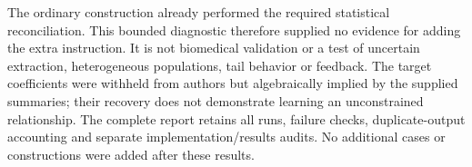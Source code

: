 \documentclass[11pt,letterpaper]{article}
\begin{document}
The ordinary construction already performed the required statistical reconciliation. This bounded diagnostic therefore supplied no evidence for adding the extra instruction. It is not biomedical validation or a test of uncertain extraction, heterogeneous populations, tail behavior or feedback. The target coefficients were withheld from authors but algebraically implied by the supplied summaries; their recovery does not demonstrate learning an unconstrained relationship. The complete report retains all runs, failure checks, duplicate-output accounting and separate implementation/\allowbreak{}results audits. No additional cases or constructions were added after these results.
\end{document}
